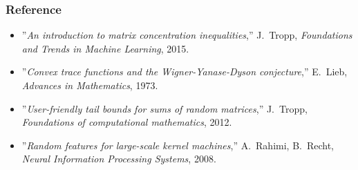 \documentclass[compress,
mathserif,wide,%
]{beamer}
\begin{document}
\begin{frame}[allowframebreaks]
\frametitle{Reference}

{\small
\begin{itemize}  \itemsep0.3em
  \item ''\textit{An introduction to matrix concentration inequalities},'' J.~Tropp, \textit{Foundations and Trends in Machine Learning}, 2015.
  \item ''\textit{Convex trace functions and the Wigner-Yanase-Dyson conjecture},'' E.~Lieb, \textit{Advances in Mathematics}, 1973.
  \item ''\textit{User-friendly tail bounds for sums of random matrices},'' J.~Tropp, \textit{Foundations of computational mathematics}, 2012.
  \item ''\textit{Random features for large-scale kernel machines},'' A.~Rahimi, B.~Recht, \textit{Neural Information Processing Systems}, 2008.  


\end{itemize}
}


\end{frame}
\end{document}

